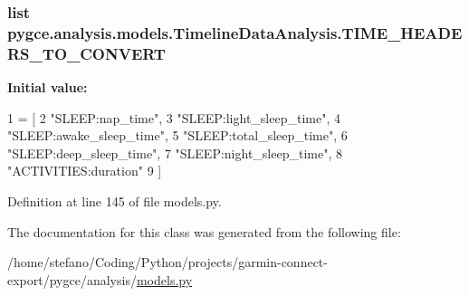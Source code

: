 \subsubsection[{\texorpdfstring{T\+I\+M\+E\+\_\+\+H\+E\+A\+D\+E\+R\+S\+\_\+\+T\+O\+\_\+\+C\+O\+N\+V\+E\+RT}{TIME_HEADERS_TO_CONVERT}}]{\setlength{\rightskip}{0pt plus 5cm}list pygce.\+analysis.\+models.\+Timeline\+Data\+Analysis.\+T\+I\+M\+E\+\_\+\+H\+E\+A\+D\+E\+R\+S\+\_\+\+T\+O\+\_\+\+C\+O\+N\+V\+E\+RT\hspace{0.3cm}{\ttfamily [static]}}\hypertarget{classpygce_1_1analysis_1_1models_1_1_timeline_data_analysis_afaebf4ce7e847ff4c32a7b9b799fd94d}{}\label{classpygce_1_1analysis_1_1models_1_1_timeline_data_analysis_afaebf4ce7e847ff4c32a7b9b799fd94d}
{\bfseries Initial value\+:}
\begin{DoxyCode}
1 = [
2         \textcolor{stringliteral}{"SLEEP:nap\_time"},
3         \textcolor{stringliteral}{"SLEEP:light\_sleep\_time"},
4         \textcolor{stringliteral}{"SLEEP:awake\_sleep\_time"},
5         \textcolor{stringliteral}{"SLEEP:total\_sleep\_time"},
6         \textcolor{stringliteral}{"SLEEP:deep\_sleep\_time"},
7         \textcolor{stringliteral}{"SLEEP:night\_sleep\_time"},
8         \textcolor{stringliteral}{"ACTIVITIES:duration"}
9     ]
\end{DoxyCode}


Definition at line 145 of file models.\+py.



The documentation for this class was generated from the following file\+:\begin{DoxyCompactItemize}
\item 
/home/stefano/\+Coding/\+Python/projects/garmin-\/connect-\/export/pygce/analysis/\hyperlink{models_8py}{models.\+py}\end{DoxyCompactItemize}
